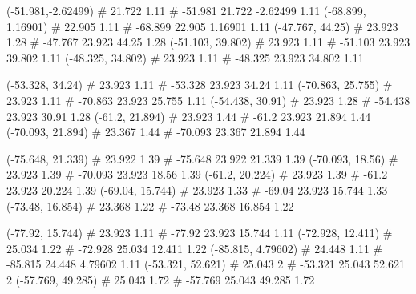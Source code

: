 \documentclass[a4paper,openbib,10pt]{article}
\newenvironment{treegraph}{\begin{graph}}{\end{graph}}
\begin{document}
\begin{treegraph}
  (-51.981,-2.62499) #     21.722    1.11
   #    -51.981    21.722    -2.62499    1.11
  (-68.899, 1.16901) #     22.905    1.11
   #    -68.899    22.905    1.16901    1.11
  (-47.767, 44.25) #     23.923    1.28
   #    -47.767    23.923    44.25    1.28
  (-51.103, 39.802) #     23.923    1.11
   #    -51.103    23.923    39.802    1.11
  (-48.325, 34.802) #     23.923    1.11
   #    -48.325    23.923    34.802    1.11

  (-53.328, 34.24) #     23.923    1.11
   #    -53.328    23.923    34.24    1.11
  (-70.863, 25.755) #     23.923    1.11
   #    -70.863    23.923    25.755    1.11
  (-54.438, 30.91) #     23.923    1.28
   #    -54.438    23.923    30.91    1.28
  (-61.2, 21.894) #     23.923    1.44
   #    -61.2    23.923    21.894    1.44
  (-70.093, 21.894) #     23.367    1.44
   #    -70.093    23.367    21.894    1.44

  (-75.648, 21.339) #     23.922    1.39
   #    -75.648    23.922    21.339    1.39
  (-70.093, 18.56) #     23.923    1.39
   #    -70.093    23.923    18.56    1.39
  (-61.2, 20.224) #     23.923    1.39
   #    -61.2    23.923    20.224    1.39
  (-69.04, 15.744) #     23.923    1.33
   #    -69.04    23.923    15.744    1.33
  (-73.48, 16.854) #     23.368    1.22
   #    -73.48    23.368    16.854    1.22

  (-77.92, 15.744) #     23.923    1.11
   #    -77.92    23.923    15.744    1.11
  (-72.928, 12.411) #     25.034    1.22
   #    -72.928    25.034    12.411    1.22
  (-85.815, 4.79602) #     24.448    1.11
   #    -85.815    24.448    4.79602    1.11
  (-53.321, 52.621) #     25.043    2
   #    -53.321    25.043    52.621    2
  (-57.769, 49.285) #     25.043    1.72
   #    -57.769    25.043    49.285    1.72


\end{treegraph}
\end{document}
